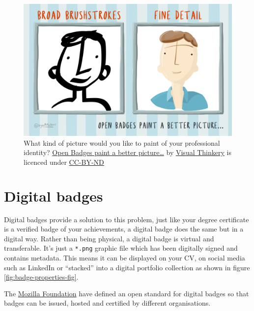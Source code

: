 \documentclass[
]{book}
\begin{document}
\begin{figure}

{\centering \includegraphics[width=1\linewidth]{images/broad-brushstrokes} 

}

\caption{What kind of picture would you like to paint of your professional identity? \href{https://bryanmmathers.com/open-badges-paint-a-better-picture/}{Open Badges paint a better picture\ldots{}} by \href{https://visualthinkery.com/}{Visual Thinkery} is licenced under \href{https://creativecommons.org/licenses/by-nd/4.0/}{CC-BY-ND}}\label{fig:fine-grained-fig}
\end{figure}



\hypertarget{digibadge}{%
\section{Digital badges}\label{digibadge}}

Digital badges provide a solution to this problem, just like your degree certificate is a verified badge of your achievements, a digital badge does the same but in a digital way. Rather than being physical, a digital badge is virtual and transferable. It's just a \texttt{*.png} graphic file which has been digitally signed and contains metadata. This means it can be displayed on your CV, on social media such as LinkedIn or ``stacked'' into a digital portfolio collection as shown in figure \ref{fig:badge-properties-fig}.

The \href{https://en.wikipedia.org/wiki/Mozilla_Foundation}{Mozilla Foundation} have defined an open standard for digital badges \citep{openbadges} so that badges can be issued, hosted and certified by different organisations. \citep{belshaw}
\end{document}
